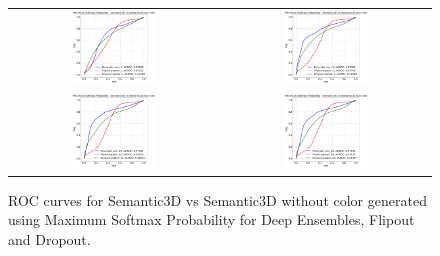     \begin{figure}
        \centering
        \begin{tabular}{cc}
            \includegraphics[width = 0.42\textwidth, height= 0.3\textheight]{images/AUROC/MSP_cnc_1.pdf} & 
            \includegraphics[width = 0.42\textwidth, height= 0.3\textheight]{images/AUROC/MSP_cnc_5.pdf}\\ 
            \includegraphics[width = 0.42\textwidth, height= 0.3\textheight]{images/AUROC/MSP_cnc_15.pdf} &
            \includegraphics[width = 0.42\textwidth, height= 0.3\textheight]{images/AUROC/MSP_cnc_20.pdf} 
            \\
        \end{tabular}
        \caption{ROC curves for Semantic3D vs Semantic3D without color generated using Maximum Softmax Probability for Deep Ensembles, Flipout and Dropout.}
        \label{fig:roc_msp_ood_2}
    \end{figure}
